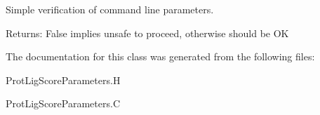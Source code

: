 Simple verification of command line parameters. 

\begin{Desc}
\item[Returns:]False implies unsafe to proceed, otherwise should be OK \end{Desc}


The documentation for this class was generated from the following files:\begin{CompactItemize}
\item 
Prot\-Lig\-Score\-Parameters.H\item 
Prot\-Lig\-Score\-Parameters.C\end{CompactItemize}
